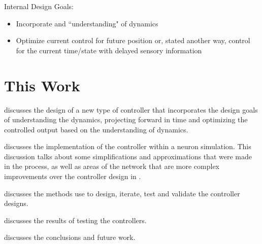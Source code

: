 Internal Design Goals:
\begin{itemize}
\item Incorporate and ``understanding" of dynamics
\item Optimize current control for future position or, stated another way,
control for the current time/state with delayed sensory information
\end{itemize}

\section{This Work}

discusses the design of a new type 
of controller that incorporates the
design goals of understanding the dynamics, projecting forward in time and
optimizing the controlled output based on the understanding of dynamics.

 discusses the implementation of the controller within 
a neuron
simulation. This discussion talks about some simplifications and approximations
that were made in the process, as well as areas of the network that are more
complex improvements over the controller design in .

 discusses the methods use to design, iterate, test and
validate the controller designs.

 discusses the results of testing the controllers.

 discusses the conclusions and future work.
